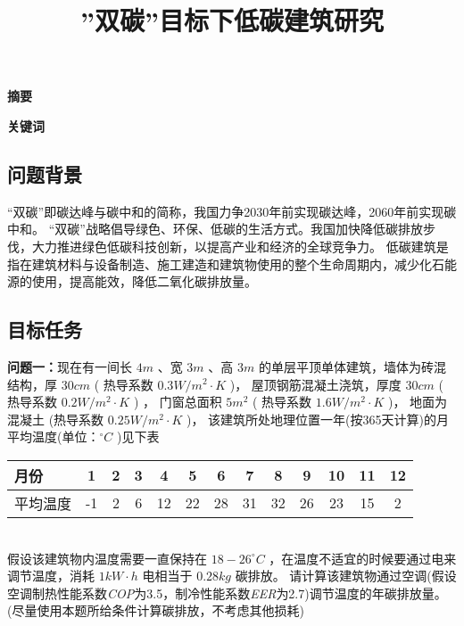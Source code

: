 \documentclass[a4paper, 12pt]{article}
\numberwithin{equation}{section}
\begin{document}
    \title{''双碳''目标下低碳建筑研究}
    \author{}
    \date{}
    \maketitle

    \centerline{\textbf{\LARGE{摘要}}}

    \textbf{\Large{关键词}}

    {}
        \subsection{问题背景}
        “双碳”即碳达峰与碳中和的简称，我国力争2030年前实现碳达峰，2060年前实现碳中和。
        “双碳”战略倡导绿色、环保、低碳的生活方式。我国加快降低碳排放步伐，大力推进绿色低碳科技创新，以提高产业和经济的全球竞争力。
        低碳建筑是指在建筑材料与设备制造、施工建造和建筑物使用的整个生命周期内，减少化石能源的使用，提高能效，降低二氧化碳排放量。

        \subsection{目标任务}
            \textbf{问题一：}现在有一间长 $ 4 m $ 、宽 $ 3 m $ 、高 $ 3 m $ 的单层平顶单体建筑，墙体为砖混结构，厚 $ 30 cm $ ( 热导系数 $ 0.3 W / m^{2} \cdot K $ )，
            屋顶钢筋混凝土浇筑，厚度 $ 30 cm $ ( 热导系数 $ 0.2 W / m^{2} \cdot K $ ) ，
            门窗总面积 $ 5 m^{2} $ ( 热导系数 $ 1.6 W / m^{2} \cdot K $ )，
            地面为混凝土 (热导系数 $ 0.25 W / m^{2} \cdot K $ )，
            该建筑所处地理位置一年(按365天计算)的月平均温度(单位：$ ^{\circ} C $ )见下表 \\
            \begin{table}
                \centering
                \begin{tabular}{|l|c|c|c|c|c|c|c|c|c|c|c|c|} \hline
                    月份 & 1 & 2 & 3 & 4 & 5 & 6 & 7 & 8 & 9 & 10 & 11 & 12 \\ \hline
                    平均温度 & -1 & 2 & 6 & 12 & 22 & 28 & 31 & 32 & 26 & 23 & 15 & 2\\ \hline
                \end{tabular}
            \end{table}
            \\ 假设该建筑物内温度需要一直保持在 $ 18 - 26 ^{\circ}C $ ，在温度不适宜的时候要通过电来调节温度，消耗 $ 1 kW \cdot h $ 电相当于 $ 0.28kg $ 碳排放。
            请计算该建筑物通过空调(假设空调制热性能系数\textit{COP}为3.5，制冷性能系数\textit{EER}为2.7)调节温度的年碳排放量。
            (尽量使用本题所给条件计算碳排放，不考虑其他损耗)
\end{document}
